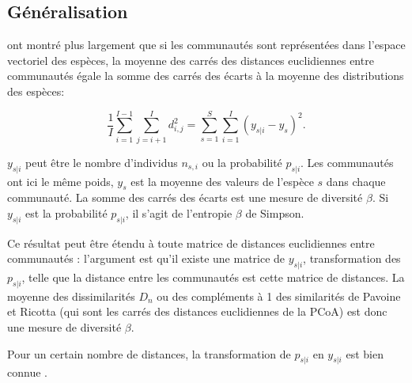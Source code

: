 \documentclass[
  11pt,
  french,
  a4paper,
  extrafontsizes,onecolumn,openright
  ]{memoir}
\begin{document}
\normalsize

\hypertarget{guxe9nuxe9ralisation}{%
\subsection{Généralisation}\label{guxe9nuxe9ralisation}}

\textcite{Legendre1999} ont montré plus largement que si les communautés sont représentées dans l'espace vectoriel des espèces, la moyenne des carrés des distances euclidiennes entre communautés égale la somme des carrés des écarts à la moyenne des distributions des espèces:

\begin{equation}
  \label{eq:Legendre1999}
  \frac{1}{I} \sum_{i=1}^{I-1}{\sum_{j=i+1}^{I}{d_{i,j}^2}}
  = \sum_{s=1}^{S}{\sum_{i=1}^{I}{\left(y_{s|i}-y_s \right)^2}}.
\end{equation}

\(y_{s|i}\) peut être le nombre d'individus \(n_{s,i}\) ou la probabilité \(p_{s|i}\).
Les communautés ont ici le même poids, \(y_s\) est la moyenne des valeurs de l'espèce \(s\) dans chaque communauté.
La somme des carrés des écarts est une mesure de diversité \(\beta\).
Si \(y_{s|i}\) est la probabilité \(p_{s|i}\), il s'agit de l'entropie \(\beta\) de Simpson.

Ce résultat peut être étendu à toute matrice de distances euclidiennes entre communautés \autocite{Legendre2005} : l'argument est qu'il existe une matrice de \(y_{s|i}\), transformation des \(p_{s|i}\), telle que la distance entre les communautés est cette matrice de distances.
La moyenne des dissimilarités \(D_n\) ou des compléments à 1 des similarités de Pavoine et Ricotta (qui sont les carrés des distances euclidiennes de la PCoA) est donc une mesure de diversité \(\beta\).

Pour un certain nombre de distances, la transformation de \(p_{s|i}\) en \(y_{s|i}\) est bien connue \autocite{Legendre2001}.



\scriptsize
\end{document}
